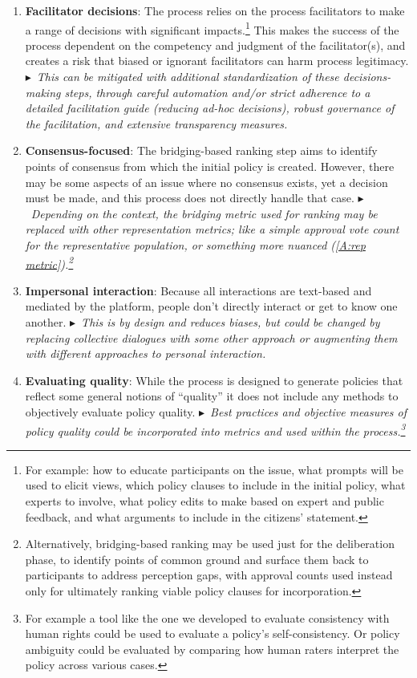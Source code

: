 \documentclass{article}
\begin{document}
\begin{enumerate}
\item 
\textbf{Facilitator decisions}: The process relies on the process facilitators to make a range of decisions with significant impacts.\footnote{For example: how to educate participants on the issue, what prompts will be used to elicit views, which policy clauses to include in the initial policy, what experts to involve, what policy edits to make based on expert and public feedback, and what arguments to include in the citizens’ statement.} This makes the success of the process dependent on the competency and judgment of the facilitator(s), and creates a risk that biased or ignorant facilitators can harm process legitimacy. $\blacktriangleright$~\emph{This can be mitigated with additional standardization of these decisions-making steps, through careful automation and/or strict adherence to a detailed facilitation guide (reducing ad-hoc decisions), robust governance of the facilitation, and extensive transparency measures.}

\item 
\textbf{Consensus-focused}: The bridging-based ranking step aims to identify points of consensus from which the initial policy is created. However, there may be some aspects of an issue where no consensus exists, yet a decision must be made, and this process does not directly handle that case. $\blacktriangleright$~\emph{Depending on the context, the bridging metric used for ranking may be replaced with other representation metrics; like a simple approval vote count for the representative population, or something more nuanced (\ref{A:rep metric}).\footnote{Alternatively, bridging-based ranking may be used just for the deliberation phase, to identify points of common ground and surface them back to participants to address perception gaps, with approval counts used instead only for ultimately ranking viable policy clauses for incorporation.}}

\item 
\textbf{Impersonal interaction}: Because all interactions are text-based and mediated by the platform, people don't directly interact or get to know one another. $\blacktriangleright$~\emph{This is by design and reduces biases, but could be changed by replacing collective dialogues with some other approach or augmenting them with different approaches to personal interaction.}

\item 
\textbf{Evaluating quality}: While the process is designed to generate policies that reflect some general notions of “quality” it does not include any methods to objectively evaluate policy quality.
    $\blacktriangleright$~\emph{Best practices and objective measures of policy quality could be incorporated into metrics and used within the process.\footnote{For example a tool like the one we developed to evaluate consistency with human rights could be used to evaluate a policy's self-consistency. Or policy ambiguity could be evaluated by comparing how human raters interpret the policy across various cases.}} 
\end{enumerate}
\end{document}
